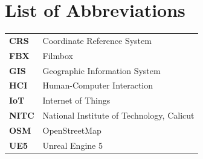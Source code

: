 \chapter*{List of Abbreviations}

\begin{tabular}{ll}
\textbf{CRS} & Coordinate Reference System \\
\textbf{FBX} & Filmbox \\
\textbf{GIS} & Geographic Information System \\
\textbf{HCI} & Human-Computer Interaction \\
\textbf{IoT} & Internet of Things \\
\textbf{NITC} & National Institute of Technology, Calicut \\
\textbf{OSM} & OpenStreetMap \\
\textbf{UE5} & Unreal Engine 5 \\
\end{tabular}
\newpage

